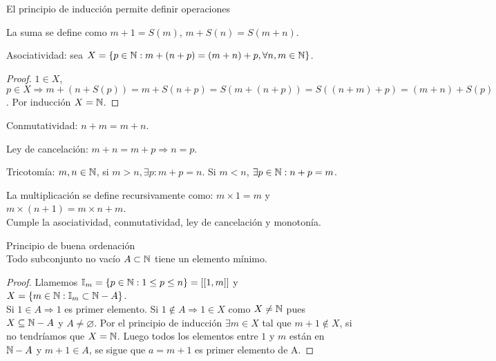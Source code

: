 El principio de inducción permite definir operaciones

La suma se define como $m+1 = S(m)$, $m+S(n) = S(m+n)$.

\begin{prop}
    Asociatividad: sea $X = \{ p \in \mathbb{N} : m+(n+p) = (m+n) +p, \forall n,m \in \mathbb{N} \}$.
    \begin{proof}
        $1 \in X$, $p \in X \Rightarrow m + (n+S(p)) = m + S(n+p) = S(m +(n+p)) = S((n+m)+p) = (m+n) + S(p)$.
        Por inducción $X = \mathbb{N}$.
    \end{proof}
\end{prop}


\begin{prop}
    Conmutatividad: $n+m = m+n$.
\end{prop}

\begin{prop}
    Ley de cancelación: $m+n = m+p \Rightarrow n=p$.
\end{prop}

\begin{prop}
    Tricotomía: $m,n \in \mathbb{N}$, si $m > n, \exists p:m+p=n$. Si $m < n$,  $\exists p \in \mathbb{N} :n+p=m$.
\end{prop}

\begin{definition}
    La multiplicación se define recursivamente como: $m \times 1 =m$ y $m \times (n+1) = m \times n + m$. \\
    Cumple la asociatividad, conmutatividad, ley de cancelación y monotonía.
\end{definition}

\begin{theorem}
    Principio de buena ordenación \\
    Todo subconjunto no vacío $A \subset \mathbb{N}$ tiene un elemento mínimo.
    \begin{proof}
        Llamemos $\mathbb{I}_m = \{ p \in \mathbb{N} : 1 \leq p \leq n \} = [[ 1, m ]]$ y $X = \{ m \in \mathbb{N} : \mathbb{I}_m \subset \mathbb{N} - A \}$. \\
        Si $1 \in A \Rightarrow 1$ es primer elemento.
        Si $1 \notin A \Rightarrow 1 \in X$ como $X \neq \mathbb{N}$ pues $X \subseteq \mathbb{N} - A$ y $A \neq \varnothing$.
        Por el principio de inducción $\exists m \in X$ tal que $m+1 \notin X$, si no tendríamos que $X = \mathbb{N}$. Luego todos los elementos entre $1$ y $m$ están en $\mathbb{N} - A$ y $m+1 \in A$, se sigue que $a = m+1$ es primer elemento de A.
    \end{proof}
\end{theorem}


